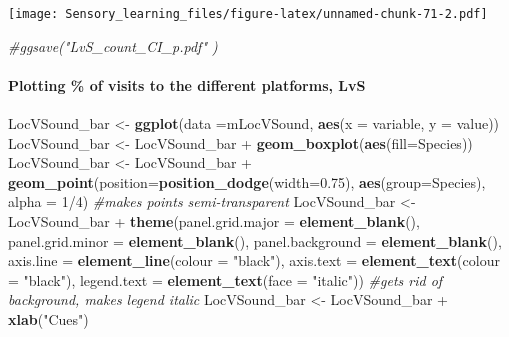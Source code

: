 \documentclass[]{article}
\newenvironment{Shaded}{\begin{snugshade}}{\end{snugshade}}
\newcommand{\KeywordTok}[1]{\textcolor[rgb]{0.13,0.29,0.53}{\textbf{{#1}}}}
\newcommand{\DataTypeTok}[1]{\textcolor[rgb]{0.13,0.29,0.53}{{#1}}}
\newcommand{\DecValTok}[1]{\textcolor[rgb]{0.00,0.00,0.81}{{#1}}}
\newcommand{\FloatTok}[1]{\textcolor[rgb]{0.00,0.00,0.81}{{#1}}}
\newcommand{\StringTok}[1]{\textcolor[rgb]{0.31,0.60,0.02}{{#1}}}
\newcommand{\CommentTok}[1]{\textcolor[rgb]{0.56,0.35,0.01}{\textit{{#1}}}}
\newcommand{\NormalTok}[1]{{#1}}
\let\oldparagraph\paragraph
\renewcommand{\paragraph}[1]{\oldparagraph{#1}\mbox{}}
\begin{document}
\texttt{[image: Sensory\_learning\_files/figure-latex/unnamed-chunk-71-2.pdf]}

\begin{Shaded}
\begin{Highlighting}[]
\CommentTok{#ggsave("LvS_count_CI_p.pdf"  )}
\end{Highlighting}
\end{Shaded}

\paragraph{Plotting \% of visits to the different platforms,
LvS}\label{plotting-of-visits-to-the-different-platforms-lvs-1}

\begin{Shaded}
\begin{Highlighting}[]
\NormalTok{LocVSound_bar <-}\StringTok{ }\KeywordTok{ggplot}\NormalTok{(}\DataTypeTok{data =}\NormalTok{mLocVSound, }\KeywordTok{aes}\NormalTok{(}\DataTypeTok{x =} \NormalTok{variable, }\DataTypeTok{y =} \NormalTok{value))}
\NormalTok{LocVSound_bar <-}\StringTok{ }\NormalTok{LocVSound_bar +}\StringTok{ }\KeywordTok{geom_boxplot}\NormalTok{(}\KeywordTok{aes}\NormalTok{(}\DataTypeTok{fill=}\NormalTok{Species))}
\NormalTok{LocVSound_bar <-}\StringTok{ }\NormalTok{LocVSound_bar +}\StringTok{ }\KeywordTok{geom_point}\NormalTok{(}\DataTypeTok{position=}\KeywordTok{position_dodge}\NormalTok{(}\DataTypeTok{width=}\FloatTok{0.75}\NormalTok{), }\KeywordTok{aes}\NormalTok{(}\DataTypeTok{group=}\NormalTok{Species), }\DataTypeTok{alpha =} \DecValTok{1}\NormalTok{/}\DecValTok{4}\NormalTok{) }\CommentTok{#makes points semi-transparent}
\NormalTok{LocVSound_bar <-}\StringTok{ }\NormalTok{LocVSound_bar +}\StringTok{ }\KeywordTok{theme}\NormalTok{(}\DataTypeTok{panel.grid.major =} \KeywordTok{element_blank}\NormalTok{(), }\DataTypeTok{panel.grid.minor =} \KeywordTok{element_blank}\NormalTok{(),}
\DataTypeTok{panel.background =} \KeywordTok{element_blank}\NormalTok{(), }\DataTypeTok{axis.line =} \KeywordTok{element_line}\NormalTok{(}\DataTypeTok{colour =} \StringTok{"black"}\NormalTok{), }\DataTypeTok{axis.text =} \KeywordTok{element_text}\NormalTok{(}\DataTypeTok{colour =} \StringTok{"black"}\NormalTok{), }\DataTypeTok{legend.text =} \KeywordTok{element_text}\NormalTok{(}\DataTypeTok{face =} \StringTok{"italic"}\NormalTok{))  }\CommentTok{#gets rid of background, makes legend italic}
\NormalTok{LocVSound_bar <-}\StringTok{ }\NormalTok{LocVSound_bar +}\StringTok{ }\KeywordTok{xlab}\NormalTok{(}\StringTok{"Cues"}\NormalTok{)}

\end{Highlighting}
\end{Shaded}
\end{document}
